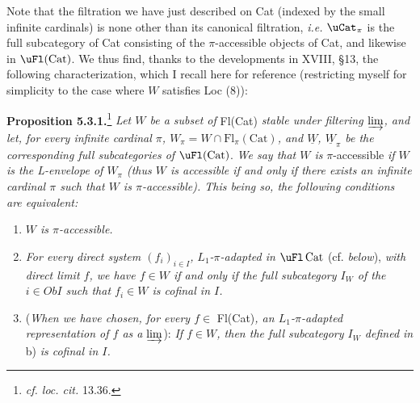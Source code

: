 Note that the filtration we have just described on Cat (indexed by the small infinite cardinals) is none other than its canonical filtration, \textit{i.e.} $\uCat_\pi$ is the full subcategory of Cat consisting of the $\pi$-accessible objects of Cat, and likewise in $\uFl(\mathrm{Cat})$. We thus find, thanks to the developments in XVIII, §13, the following characterization, which I recall here for reference (restricting myself for simplicity to the case where $W$ satisfies Loc (8)):

\textbf{Proposition 5.3.1.}\footnote[38]{\textit{cf. loc. cit.} 13.36.} \textit{Let $W$ be a subset of} Fl(Cat) \textit{stable under filtering $\varinjlim$, and let, for every infinite cardinal $\pi$, $W_\pi = W \cap \mathrm{Fl}_\pi(\mathrm{Cat})$, and $\underline{W}$, $\underline{W}_\pi$ be the corresponding full subcategories of} $\uFl(\mathrm{Cat})$. \textit{We say that $W$ is} $\pi$-accessible \textit{if $W$ is the L-envelope of $W_\pi$ (thus $W$ is accessible if and only if there exists an infinite cardinal $\pi$ such that $W$ is $\pi$-accessible). This being so, the following conditions are equivalent:}


\begin{enumerate}[label={}]
\item[a)] \textit{$W$ is $\pi$-accessible.}
\item[b)] \textit{For every direct system $(f_i)_{i\in I}$,}
\textit{$L_1$-$\pi$-adapted in} $\uFl\,\mathrm{Cat}$ (cf. \textit{below}), \textit{with direct limit $f$, we have $f \in W$ if and only if the full subcategory $I_W$ of the $i \in \mathit{Ob}I$ such that $f_i \in W$ is cofinal in $I$.}
\item[b$'$)] (\textit{When we have chosen, for every $f \in$} Fl(Cat)\textit{, an $L_1$-$\pi$-adapted representation of $f$ as a $\varinjlim$}): \textit{If $f \in W$, then the full subcategory $I_W$ defined in} b) \textit{is cofinal in $I$.}
\end{enumerate}

